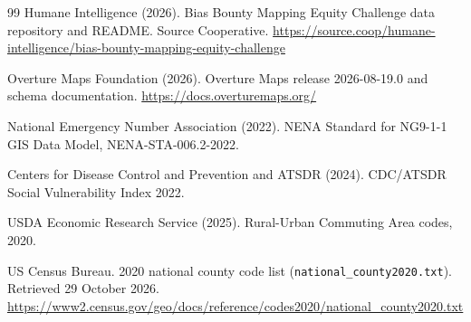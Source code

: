 \documentclass[11pt]{article}
\begin{document}
\begin{thebibliography}{99}
Humane Intelligence (2026). Bias Bounty Mapping Equity Challenge data
repository and README. Source Cooperative.
\url{https://source.coop/humane-intelligence/bias-bounty-mapping-equity-challenge}

Overture Maps Foundation (2026). Overture Maps release 2026-08-19.0 and
schema documentation. \url{https://docs.overturemaps.org/}

National Emergency Number Association (2022). NENA Standard for NG9-1-1 GIS
Data Model, NENA-STA-006.2-2022.

Centers for Disease Control and Prevention and ATSDR (2024). CDC/ATSDR Social
Vulnerability Index 2022.

USDA Economic Research Service (2025). Rural-Urban Commuting Area codes,
2020.

US Census Bureau. 2020 national county code list
(\texttt{national\_county2020.txt}). Retrieved 29 October 2026.
\url{https://www2.census.gov/geo/docs/reference/codes2020/national_county2020.txt}

\end{thebibliography}
\end{document}
